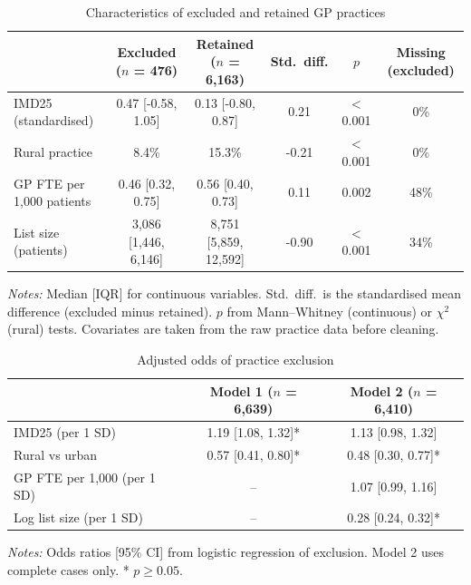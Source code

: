 \begin{table}[htbp]
\centering
\caption{Characteristics of excluded and retained GP practices}
\label{tab:exclusion_descriptives}
\footnotesize
\renewcommand{\arraystretch}{1.2}
\begin{tabular}{lccccc}
\toprule
 & Excluded ($n$ = 476) & Retained ($n$ = 6,163) & Std.\ diff. & $p$ & Missing (excluded) \\
\midrule
IMD25 (standardised) & 0.47 [-0.58, 1.05] & 0.13 [-0.80, 0.87] & 0.21 & $<$0.001 & 0\% \\
Rural practice & 8.4\% & 15.3\% & -0.21 & $<$0.001 & 0\% \\
GP FTE per 1,000 patients & 0.46 [0.32, 0.75] & 0.56 [0.40, 0.73] & 0.11 & 0.002 & 48\% \\
List size (patients) & 3,086 [1,446, 6,146] & 8,751 [5,859, 12,592] & -0.90 & $<$0.001 & 34\% \\
\bottomrule
\end{tabular}
\par\vspace{4pt}
{\footnotesize \textit{Notes:} Median [IQR] for continuous variables. Std.\ diff.\ is the standardised mean difference (excluded minus retained). $p$ from Mann--Whitney (continuous) or $\chi^2$ (rural) tests. Covariates are taken from the raw practice data before cleaning.\par}
\end{table}

\begin{table}[htbp]
\centering
\caption{Adjusted odds of practice exclusion}
\label{tab:exclusion_logit}
\footnotesize
\renewcommand{\arraystretch}{1.2}
\begin{tabular}{lcc}
\toprule
 & Model 1 ($n$ = 6,639) & Model 2 ($n$ = 6,410) \\
\midrule
IMD25 (per 1 SD) & 1.19 [1.08, 1.32]* & 1.13 [0.98, 1.32] \\
Rural vs urban & 0.57 [0.41, 0.80]* & 0.48 [0.30, 0.77]* \\
GP FTE per 1,000 (per 1 SD) & -- & 1.07 [0.99, 1.16] \\
Log list size (per 1 SD) & -- & 0.28 [0.24, 0.32]* \\
\bottomrule
\end{tabular}
\par\vspace{4pt}
{\footnotesize \textit{Notes:} Odds ratios [95\% CI] from logistic regression of exclusion. Model 2 uses complete cases only. * $p\geq0.05$.\par}
\end{table}

